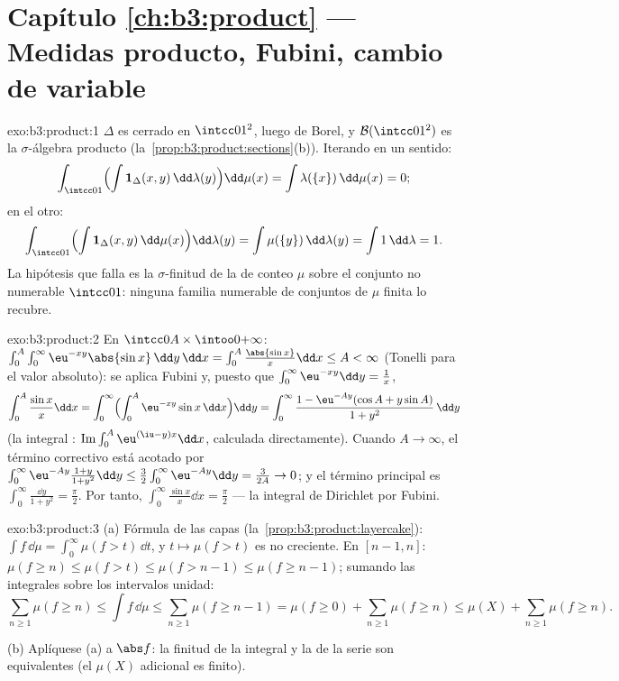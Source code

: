 \section*{Capítulo \ref{ch:b3:product} --- Medidas producto,
Fubini, cambio de variable}

\begin{solution}{exo:b3:product:1}
$\Delta$ es cerrado en $\intcc01^2$, luego de Borel, y $\mathcal
B(\intcc01^2)$ es la $\sigma$-álgebra producto
(la~\cref{prop:b3:product:sections}(b)). Iterando en un sentido:
\[
\int_{\intcc01}\Bigl(\int \mathbf 1_\Delta(x,y)
\,\dd\lambda(y)\Bigr)\dd\mu(x)
= \int \lambda(\{x\})\,\dd\mu(x) = 0 ;
\]
en el otro:
\[
\int_{\intcc01}\Bigl(\int\mathbf
1_\Delta(x,y)\,\dd\mu(x)\Bigr)\dd\lambda(y)
= \int \mu(\{y\})\,\dd\lambda(y) = \int 1\,\dd\lambda = 1 .
\]
La hipótesis que falla es la $\sigma$-finitud de la
 de conteo $\mu$ sobre el
conjunto no numerable $\intcc01$: ninguna familia numerable de conjuntos
de $\mu$ finita lo recubre.
\end{solution}

\begin{solution}{exo:b3:product:2}
En $\intcc0A\times\intoo0{+\infty}$:
$\int_0^A\int_0^\infty\eu^{-xy}\abs{\sin x}\,\dd y\,\dd x =
\int_0^A\frac{\abs{\sin x}}x\dd x \leq A < \infty$ (Tonelli para el
valor absoluto): se aplica Fubini y, puesto que
$\int_0^\infty\eu^{-xy}\dd y = \frac1x$,
\[
\int_0^A\frac{\sin x}x\dd x
= \int_0^\infty\Bigl(\int_0^A\eu^{-xy}\sin x\,\dd
x\Bigr)\dd y
= \int_0^\infty \frac{1 - \eu^{-Ay}(\cos A + y\sin A)}{1 +
y^2}\,\dd y
\]
(la integral : $\operatorname{Im}\int_0^A\eu^{(\iu -
y)x}\dd x$, calculada directamente). Cuando $A \to \infty$, el término
correctivo está acotado por $\int_0^\infty\eu^{-Ay}\frac{1 +
y}{1 + y^2}\dd y \leq \frac32\int_0^\infty\eu^{-Ay}\dd y =
\frac3{2A} \to 0$; y el término principal es
$\int_0^\infty\frac{\dd y}{1+y^2} = \frac\pi2$. Por tanto,
$\int_0^\infty\frac{\sin x}x\dd x = \frac\pi2$ --- la integral de
Dirichlet por Fubini.
\end{solution}

\begin{solution}{exo:b3:product:3}
(a) Fórmula de las capas (la~\cref{prop:b3:product:layercake}): $\int
f\,\dd\mu = \int_0^\infty\mu(f > t)\,\dd t$, y $t \mapsto
\mu(f > t)$ es no creciente. En $[n-1, n]$: $\mu(f \geq n)
\leq \mu(f > t) \leq \mu(f > n - 1) \leq \mu(f \geq n - 1)$; sumando las
integrales sobre los intervalos unidad:
\[
\sum_{n\geq1}\mu(f \geq n) \leq \int f\,\dd\mu \leq
\sum_{n\geq1}\mu(f \geq n - 1) = \mu(f \geq 0) +
\sum_{n\geq1}\mu(f\geq n) \leq \mu(X) + \sum_{n\geq1}\mu(f\geq
n).
\]

(b) Aplíquese (a) a $\abs f$: la finitud de la integral y la de la serie
son equivalentes (el $\mu(X)$ adicional es finito).
\end{solution}

